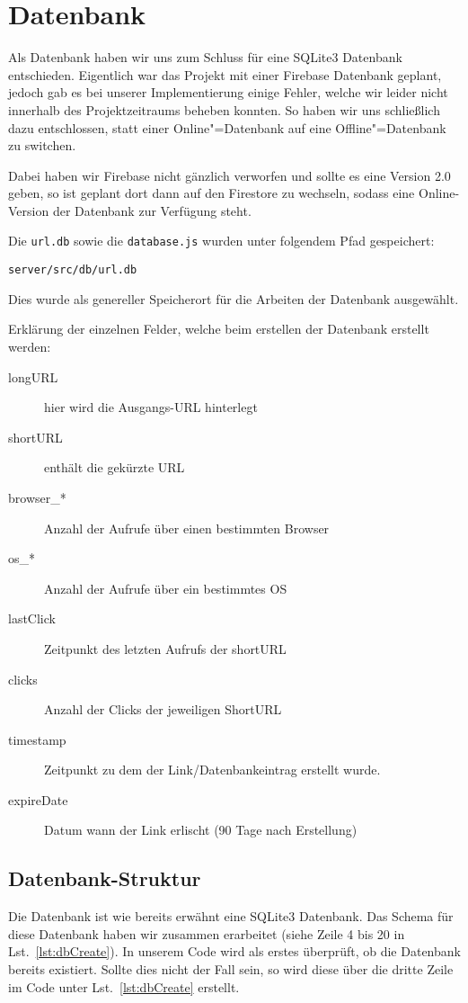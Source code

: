 \documentclass[a4paper,11pt,DIV=12]{scrreprt}%
\begin{document}
\section{Datenbank} \label{sec:Datenbank}
Als Datenbank haben wir uns zum Schluss für eine SQLite3 Datenbank entschieden. Eigentlich war das Projekt mit einer Firebase Datenbank geplant, jedoch gab es bei unserer Implementierung einige Fehler, welche wir leider nicht innerhalb des Projektzeitraums beheben konnten. So haben wir uns schließlich dazu entschlossen, statt einer Online"=Datenbank auf eine Offline"=Datenbank zu switchen.

Dabei haben wir Firebase nicht gänzlich verworfen und sollte es eine Version 2.0 geben, so ist geplant dort dann auf den Firestore zu wechseln, sodass eine Online-Version der Datenbank zur Verfügung steht.

Die \texttt{url.db} sowie die \texttt{database.js} wurden unter folgendem Pfad gespeichert:

\texttt{server/src/db/url.db}


Dies wurde als genereller Speicherort für die Arbeiten der Datenbank ausgewählt.


Erklärung der einzelnen Felder, welche beim erstellen der Datenbank erstellt werden:

\begin{description}
    \item[longURL] hier wird die Ausgangs-URL hinterlegt
    \item[shortURL] enthält die gekürzte URL
    \item[browser\_*] Anzahl der Aufrufe über einen bestimmten Browser
    \item[os\_*] Anzahl der Aufrufe über ein bestimmtes OS
    \item[lastClick] Zeitpunkt des letzten Aufrufs der shortURL
    \item[clicks] Anzahl der Clicks der jeweiligen ShortURL
    \item[timestamp] Zeitpunkt zu dem der Link/Datenbankeintrag erstellt wurde.
    \item[expireDate] Datum wann der Link erlischt (90 Tage nach Erstellung)
\end{description}

\subsection{Datenbank-Struktur}
Die Datenbank ist wie bereits erwähnt eine SQLite3 Datenbank. Das Schema für diese Datenbank haben wir zusammen erarbeitet (siehe Zeile 4 bis 20 in Lst.~\ref{lst:dbCreate}). In unserem Code wird als erstes überprüft, ob die Datenbank bereits existiert. Sollte dies nicht der Fall sein, so wird diese über die dritte Zeile im Code unter Lst.~\ref{lst:dbCreate} erstellt. 
\end{document}
